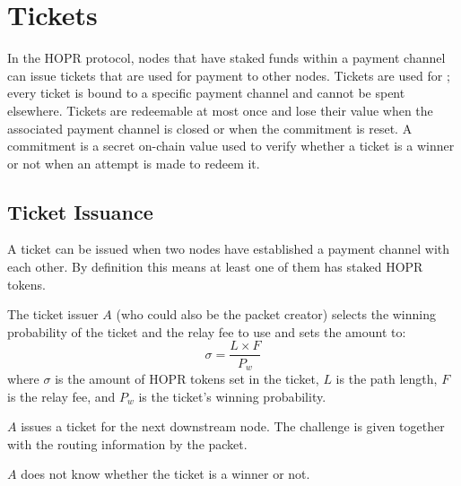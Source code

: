 \section{Tickets}
\label{sec:tickets}

In the HOPR protocol, nodes that have staked funds within a payment channel can
issue tickets that are used for payment to other nodes. Tickets are used for
; every ticket is bound to a specific payment
channel and cannot be spent elsewhere. Tickets are redeemable at most once and
lose their value when the associated payment channel is closed or when the commitment is reset. A
commitment is a secret on-chain value used to verify whether a ticket is
a winner or not when an attempt is made to redeem it.

\subsection{Ticket Issuance}

A ticket can be issued when two nodes have established a payment channel with
each other. By definition this means at least one of them has staked HOPR tokens.

The ticket issuer $A$ (who could also be the packet creator) selects the
winning probability of the ticket and the relay fee to use and sets the amount to:
$$\sigma=\dfrac{L\times F}{P_w}$$
where $\sigma$ is the amount of HOPR tokens set in the ticket, $L$ is the path
length, $F$ is the relay fee, and $P_w$ is the ticket's winning probability.

$A$ issues a ticket for the next downstream node.
The challenge is given together with the routing information by the packet.

$A$ does not know whether the ticket is a winner or not.
    
